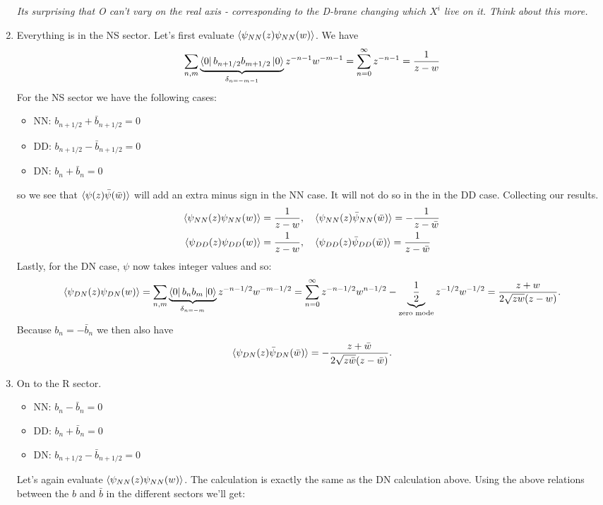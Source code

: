 \documentclass[11pt]{article}
\begin{document}
\begin{enumerate}
	\emph{Its surprising that O can't vary on the real axis - corresponding to the D-brane changing which $X^i$ live on it. Think about this more.}
	 
	\item Everything is in the NS sector. Let's first evaluate $\braket{\psi_{NN}(z) \psi_{NN} (w)}$. We have
	\[
		\sum_{n,m} \underbrace{\bra{0} b_{n+1/2} b_{m+1/2} \ket{0}}_{\delta_{n=-m-1}} z^{-n-1} w^{-m-1} = \sum_{n=0}^\infty z^{-n-1} = \frac{1}{z-w}
	\]
	For the NS sector we have the following cases:
	\begin{itemize}
		\item NN: $b_{n+1/2} + \bar b_{n+1/2} = 0$
		\item DD: $b_{n+1/2} -\bar b_{n+1/2} = 0$
		\item DN: $b_n + \bar b_n = 0$
	\end{itemize}
	so we see that $\braket{\psi(z) \bar \psi(\bar w)}$ will add an extra minus sign in the NN case. It will not do so in the in the DD case. Collecting our results. 
	\[
	\begin{aligned}
		\braket{\psi_{NN}(z) \psi_{NN} (w)} &= \frac{1}{z-w}, \quad 
		\braket{\psi_{NN}(z) \bar \psi_{NN} (\bar w)} = -\frac{1}{z-\bar w} \\
		\braket{\psi_{DD}(z) \psi_{DD} (w)} &= \frac{1}{z-w}, \quad 
		\braket{\psi_{DD}(z) \bar \psi_{DD} (\bar w)} = \frac{1}{z-\bar w}\\
	\end{aligned}
	\]
	Lastly, for the DN case, $\psi$ now takes integer values and so:
	\[
		\braket{\psi_{DN}(z) \psi_{DN} (w)} = \sum_{n, m} \underbrace{\bra{0} b_n b_m \ket{0}}_{\delta_{n=-m}} z^{-n-1/2} w^{-m-1/2} = \sum_{n=0}^\infty z^{-n-1/2} w^{n-1/2} - \underbrace{\frac12}_{\text{zero mode}} z^{-1/2} w^{-1/2} = \frac{z+w}{2 \sqrt{z w} (z - w)}.
	\]
	Because $b_n = -\bar b_n$ we then also have
	\[
		\braket{\psi_{DN}(z) \bar \psi_{DN} (\bar w)} = - \frac{z+\bar w}{2 \sqrt{z \bar w} (z - \bar w)}.
	\]
	\item 
	On to the R sector.
	\begin{itemize}
		\item NN: $b_{n} - \bar b_n = 0$
		\item DD: $b_{n} + \bar b_n = 0$
		\item DN: $b_{n+1/2} - \bar b_{n+1/2} = 0$
	\end{itemize}
	 Let's again evaluate $\braket{\psi_{NN}(z) \psi_{NN} (w)}$. The calculation is exactly the same as the DN calculation above. Using the above relations between the $b$ and $\bar b$ in the different sectors we'll get:

\end{enumerate}
\end{document}
